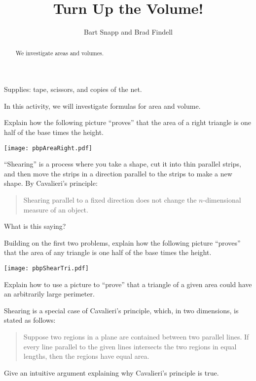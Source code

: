 \documentclass[nooutcomes]{ximera}
\title{Turn Up the Volume!}
\author{Bart Snapp and Brad Findell}
\begin{document}
\begin{abstract}
  We investigate areas and volumes.
\end{abstract}
\maketitle

\begin{teachingnote}
Supplies: tape, scissors, and copies of the net.
\end{teachingnote}
In this activity, we will investigate formulas for area and
volume.


\begin{problem}
Explain how the following picture ``proves'' that the area of a right
  triangle is one half of the base times the height.
\begin{image}
\texttt{[image: pbpAreaRight.pdf]}
\end{image}
\end{problem}

\begin{problem}
``Shearing'' is a process where you take a shape, cut it into thin parallel strips, 
and then move the strips in a direction parallel to the strips to make a new shape.  
By Cavalieri's principle:
\begin{quote}
Shearing parallel to a fixed direction does not change the $n$-dimensional measure of an object.
\end{quote}
What is this saying?
\end{problem}

\begin{problem}
Building on the first two problems, explain how the following picture
  ``proves'' that the area of any triangle is one half of the base times the
  height.
\begin{image}
\texttt{[image: pbpShearTri.pdf]}
\end{image}
\end{problem}

\begin{problem}
Explain how to use a picture to ``prove'' that a triangle of a given
  area could have an arbitrarily large perimeter.
\end{problem}
\vspace{.25in}

\begin{problem}
Shearing is a special case of Cavalieri's principle, which, in two dimensions, is stated as follows:  
\begin{quote}
Suppose two regions in a plane are contained between two parallel lines.  If every line parallel to the given lines intersects the two regions in equal lengths, then the regions have equal area.  
\end{quote}
Give an intuitive argument explaining why Cavalieri's principle is true.
\end{problem}
\end{document}
